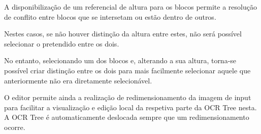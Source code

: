 
A disponibilização de um referencial de altura para os blocos permite a resolução de conflito entre blocos que se intersetam ou estão dentro de outros.

Nestes casos, se não houver distinção da altura entre estes, não será possível selecionar o pretendido entre os dois.



No entanto, selecionando um dos blocos e, alterando a sua altura, torna-se possível criar distinção entre os dois para mais facilmente selecionar aquele que anteriormente não era diretamente selecionável.





O editor permite ainda a realização de redimensionamento da imagem de input para facilitar a visualização e edição local da respetiva parte da OCR Tree nesta. A OCR Tree é automaticamente deslocada sempre que um redimensionamento ocorre.











